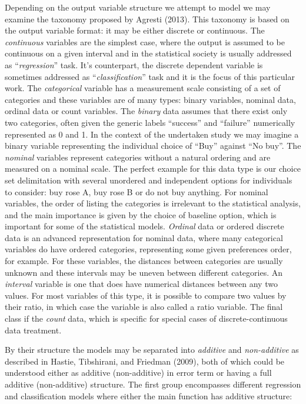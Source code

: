 \documentclass[11pt,]{article}
\begin{document}
Depending on the output variable structure we attempt to model we may
examine the taxonomy proposed by Agresti (2013). This taxonomy is based
on the output variable format: it may be either discrete or continuous.
The \emph{continuous} variables are the simplest case, where the output
is assumed to be continuous on a given interval and in the statistical
society is usually addressed as ``\emph{regression}'' task. It's
counterpart, the discrete dependent variable is sometimes addressed as
``\emph{classification}'' task and it is the focus of this particular
work. The \emph{categorical} variable has a measurement scale consisting
of a set of categories and these variables are of many types: binary
variables, nominal data, ordinal data or count variables. The
\emph{binary} data assumes that there exist only two categories, often
given the generic labels ``success'' and ``failure'' numerically
represented as 0 and 1. In the context of the undertaken study we may
imagine a binary variable representing the individual choice of ``Buy''
against ``No buy''. The \emph{nominal} variables represent categories
without a natural ordering and are measured on a nominal scale. The
perfect example for this data type is our choice set delimitation with
several unordered and independent options for individuals to consider:
buy rose A, buy rose B or do not buy anything. For nominal variables,
the order of listing the categories is irrelevant to the statistical
analysis, and the main importance is given by the choice of baseline
option, which is important for some of the statistical models.
\emph{Ordinal} data or ordered discrete data is an advanced
representation for nominal data, where many categorical variables do
have ordered categories, representing some given preferences order, for
example. For these variables, the distances between categories are
usually unknown and these intervals may be uneven between different
categories. An \emph{interval} variable is one that does have numerical
distances between any two values. For most variables of this type, it is
possible to compare two values by their ratio, in which case the
variable is also called a ratio variable. The final class if the
\emph{count} data, which is specific for special cases of
discrete-continuous data treatment.

By their structure the models may be separated into \emph{additive} and
\emph{non-additive} as described in Hastie, Tibshirani, and Friedman
(2009), both of which could be understood either as additive
(non-additive) in error term or having a full additive (non-additive)
structure. The first group encompasses different regression and
classification models where either the main function has additive
structure:
\end{document}
